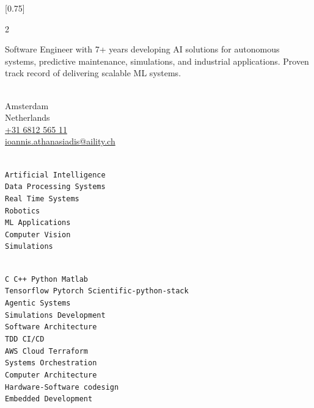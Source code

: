 \documentclass[lighthipster]{simplehipstercv}
\begin{document}
\setlength{\columnsep}{0.8cm}
[0.75]
\begin{paracol}{2}

\paracolbackgroundoptions


\footnotesize
{\setasidefontcolour
\flushleft
\begin{center}
\end{center}
Software Engineer with 7+ years developing AI solutions for autonomous systems, predictive maintenance, simulations, and industrial applications. Proven track record of delivering scalable ML systems.
\flushright


\\[0.5em]
{\footnotesize
Amsterdam \\
Netherlands\\[.2cm]
\href{tel:+31681256511}{+31 6812 565 11}\\ %
\href{mailto:ioannis.athanasiadis@aility.ch}{ioannis.athanasiadis@aility.ch}} %
\bigskip

\\[0.5em]
\texttt{Artificial Intelligence}\\[0.1em]
\texttt{Data Processing Systems}\\[0.1em]
\texttt{Real Time Systems}\\[0.1em]
\texttt{Robotics}\\[0.1em]
\texttt{ML Applications}\\[0.1em]
\texttt{Computer Vision}\\[0.1em]
\texttt{Simulations}\\[0.1em]
\bigskip

\\[0.5em]
\texttt{C C++ Python Matlab}\\
\texttt{Tensorflow Pytorch Scientific-python-stack}\\
\texttt{Agentic Systems}\\
\texttt{Simulations Development}\\
\texttt{Software Architecture}\\
\texttt{TDD CI/CD}\\
\texttt{AWS Cloud Terraform}\\
\texttt{Systems Orchestration}\\
\texttt{Computer Architecture}\\
\texttt{Hardware-Software codesign}\\
\texttt{Embedded Development}\\
\bigskip

}
\end{paracol}
\end{document}
